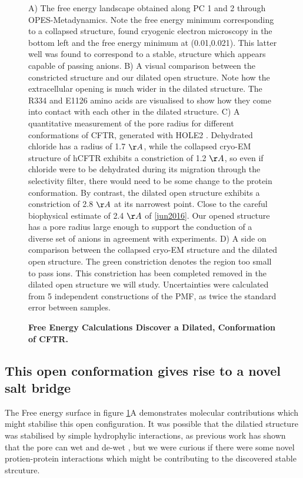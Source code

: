 \begin{figure}
	\caption[Free Energy Calculations Discover a Dilated, Conformation of CFTR.] {\textbf{Free Energy Calculations Discover a Dilated, Conformation of CFTR.}}{A) The free energy landscape obtained along PC 1 and 2 through OPES-Metadynamics. Note the free energy minimum corresponding to a collapsed structure, found cryogenic electron microscopy in the bottom left and the free energy minimum at (0.01,0.021). This latter well was found to correspond to a stable, structure which appears capable of passing anions. B) A visual comparison between the constricted structure and our dilated open structure. Note how the extracellular opening is much wider in the dilated structure. The R334 and E1126 amino acids are visualised to show how they come into contact with each other in the dilated structure. C) A quantitative measurement of the pore radius for different conformations of CFTR, generated with HOLE2 \cite{smart1996}. Dehydrated chloride has a radius of 1.7 $\AA$, while the collapsed cryo-EM structure of hCFTR exhibits a constriction of 1.2 $\AA$, so even if chloride were to be dehydrated during its migration through the selectivity filter, there would need to be some change to the protein conformation. By contrast, the dilated open structure exhibits a constriction of 2.8 $\AA$ at its  narrowest point. Close to the careful biophysical estimate of 2.4 $\AA$ of \ref{jun2016}. Our opened structure has a pore radius large enough to support the conduction of a diverse set of anions in agreement with experiments.  D) A side on comparison between the collapsed cryo-EM structure and the dilated open structure. The green constriction denotes the region too small to pass ions. This constriction has been completed removed in the dilated open structure we will study. Uncertainties were calculated from 5 independent constructions of the PMF, as twice the standard error between samples.}
	\label{summary_FES}
\end{figure}


\subsection{This open conformation gives rise to a novel salt bridge}
\label{salt_bridge}
The Free energy surface in figure \ref{summary_FES}A demonstrates molecular contributions which might stabilise this open configuration. It was possible that the dilatied structure was stabilised by simple hydrophylic interactions, as previous work has shown that the pore can wet and de-wet \cite{}, but we were curious if there were some novel protien-protein interactions which might be contributing to the discovered stable strcuture. 

